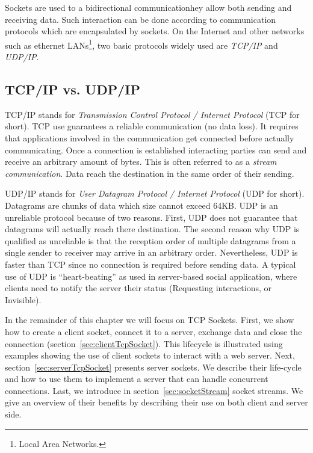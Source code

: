 \documentclass[a4paper,10pt,twoside]{book}
\begin{document}
Sockets are used to  a bidirectional communicationhey allow both sending and receiving data. 
Such interaction can be done according to communication protocols which are encapsulated by sockets. On the Internet and other networks such as ethernet LANs\footnote{Local Area Networks.}, two basic protocols widely used are \textit{TCP/IP} and \textit{UDP/IP}.

\subsection{TCP/IP vs. UDP/IP}
TCP/IP stands for \textit{Transmission Control Protocol / Internet Protocol} (TCP for short).
TCP use guarantees a reliable communication (no data loss). It requires that applications involved in the communication get connected before actually communicating. 
Once a connection is established interacting parties can send and receive an arbitrary amount of bytes. This is often referred to as a \textit{stream communication}.
Data reach the destination in the same order of their sending.

UDP/IP stands for \textit{User Datagram Protocol / Internet Protocol} (UDP for short).
Datagrams are chunks of data which size cannot exceed 64KB.
UDP is an unreliable protocol because of two reasons.
First, UDP does not guarantee that  datagrams will actually reach there destination.
The second reason why UDP is qualified as unreliable is that the reception order of multiple datagrams from a single sender to  receiver may arrive in an arbitrary order.
Nevertheless, UDP is faster than TCP since no connection is required before sending data.
A typical use of UDP is  ``heart-beating'' as used in server-based social application, where clients need to notify the server their status (\eg Requesting interactions, or Invisible).

In the remainder of this chapter we will focus on TCP Sockets.
First, we show how to create a client socket, connect it to a server, exchange data and close the connection (section~\ref{sec:clientTcpSocket}).
This lifecycle is illustrated using examples showing the use of client sockets to interact with a web server. 
Next, section~\ref{sec:serverTcpSocket} presents server sockets.
We describe their life-cycle and how to use them to implement a server that can handle  concurrent connections.
Last, we introduce in section~\ref{sec:socketStream} socket streams.
We give an overview of their benefits by describing their use on both client and server side.
 
\end{document}
